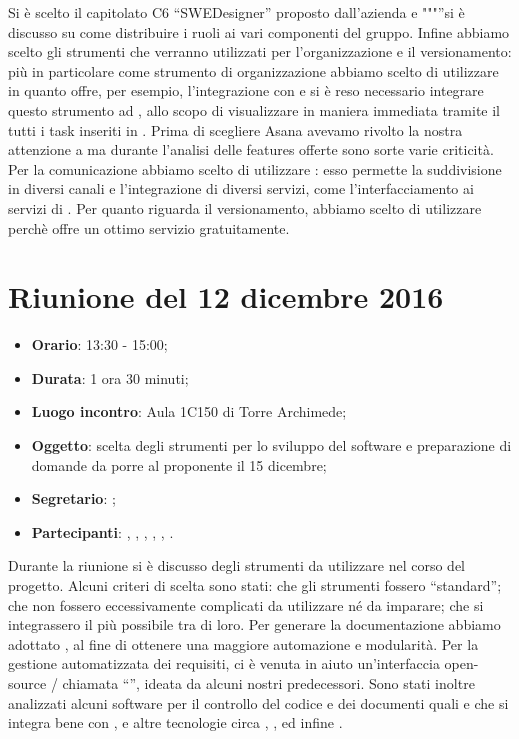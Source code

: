 Si è scelto il capitolato C6 “SWEDesigner” proposto dall'azienda \ZU e """”si è discusso su come distribuire i ruoli ai vari componenti del gruppo.
Infine abbiamo scelto gli strumenti che verranno utilizzati per l'organizzazione e il versionamento: più in particolare come strumento di organizzazione abbiamo scelto di utilizzare  in quanto offre, per esempio, l'integrazione con  e si è reso necessario integrare questo strumento ad , allo scopo di visualizzare in maniera immediata tramite il  tutti i task inseriti in . Prima di scegliere Asana avevamo rivolto la nostra attenzione a  ma durante l'analisi delle features offerte sono sorte varie criticità. Per la comunicazione abbiamo scelto di utilizzare : esso permette la suddivisione in diversi canali e l'integrazione di diversi servizi, come l'interfacciamento ai servizi di . Per quanto riguarda il versionamento, abbiamo scelto di utilizzare   perchè offre un ottimo servizio gratuitamente.



\section{Riunione del 12 dicembre 2016}

\begin{itemize}
	\item \textbf{Orario}: 13:30 - 15:00;
	\item \textbf{Durata}: 1 ora 30 minuti;
	\item \textbf{Luogo incontro}: Aula 1C150 di Torre Archimede; 
	\item \textbf{Oggetto}: scelta degli strumenti per lo sviluppo del software e preparazione di domande da porre al proponente il 15 dicembre;
	\item \textbf{Segretario}: \PB; 
	\item \textbf{Partecipanti}: \AZ, \GG, \LB, \LS, \MM, \PB.
\end{itemize}

Durante la riunione si è discusso degli strumenti da utilizzare nel corso del progetto. Alcuni criteri di scelta sono stati: che gli strumenti fossero “standard”; che non fossero eccessivamente complicati da utilizzare né da imparare; che si integrassero il più possibile tra di loro. Per generare la documentazione abbiamo adottato , al fine di ottenere una maggiore automazione e modularità. Per la gestione automatizzata dei requisiti, ci è venuta in aiuto un'interfaccia open-source / chiamata “”, ideata da alcuni nostri predecessori. Sono stati inoltre analizzati alcuni software per il controllo del codice e dei documenti quali  e  che si integra bene con , e altre tecnologie circa , ,  ed infine .

